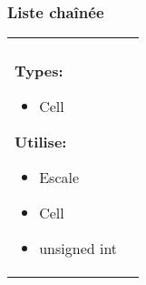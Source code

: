 \documentclass[a4paper, 11pt, oneside]{article}
\begin{document}
		\footnotetext{\textcolor{red}{Nom des opérations interne}} 
		\footnotetext{\textcolor{green}{Arguments}} 
		\footnotetext{\textcolor{blue}{Types de retour}} 
		\footnotetext{\textcolor{magenta}{Nom des opérations d'observation}}
		
		\subsubsection{Liste chaînée}
			\begin{tabular}{|p{17cm}|c}
				\hline
				\\
				
				\textbf{Types:}
					\begin{itemize}
						\item[] Cell
					\end{itemize}
				
				\textbf{Utilise:}
					\begin{itemize}
						\item[] Escale
						\item[] Cell
						\item[] unsigned int
					\end{itemize}
				

\end{tabular}
\end{document}
